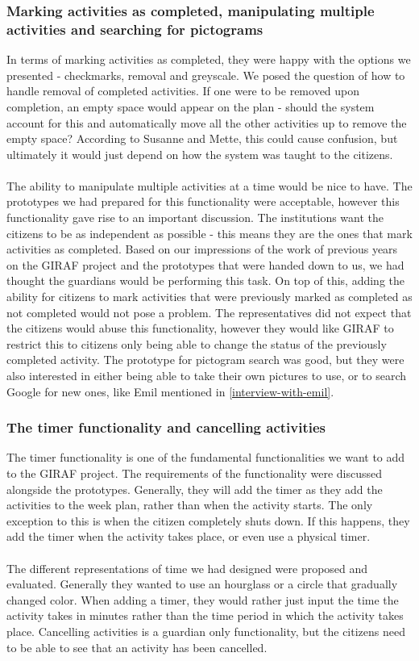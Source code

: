 \subsubsection{Marking activities as completed, manipulating multiple activities and searching for pictograms}
In terms of marking activities as completed, they were happy with the options we presented - checkmarks, removal and greyscale.
We posed the question of how to handle removal of completed activities.
If one were to be removed upon completion, an empty space would appear on the plan - should the system account for this and automatically move all the other activities up to remove the empty space?
According to Susanne and Mette, this could cause confusion, but ultimately it would just depend on how the system was taught to the citizens.
\\\\
The ability to manipulate multiple activities at a time would be nice to have.
The prototypes we had prepared for this functionality were acceptable, however this functionality gave rise to an important discussion.
The institutions want the citizens to be as independent as possible - this means they are the ones that mark activities as completed.
Based on our impressions of the work of previous years on the GIRAF project and the prototypes that were handed down to us, we had thought the guardians would be performing this task.
On top of this, adding the ability for citizens to mark activities that were previously marked as completed as not completed would not pose a problem.
The representatives did not expect that the citizens would abuse this functionality, however they would like GIRAF to restrict this to citizens only being able to change the status of the previously completed activity.
The prototype for pictogram search was good, but they were also interested in either being able to take their own pictures to use, or to search Google for new ones, like Emil mentioned in \autoref{interview-with-emil}.

\subsubsection{The timer functionality and cancelling activities}
The timer functionality is one of the fundamental functionalities we want to add to the GIRAF project.
The requirements of the functionality were discussed alongside the prototypes.
Generally, they will add the timer as they add the activities to the week plan, rather than when the activity starts.
The only exception to this is when the citizen completely shuts down.
If this happens, they add the timer when the activity takes place, or even use a physical timer.
\\\\
The different representations of time we had designed were proposed and evaluated.
Generally they wanted to use an hourglass or a circle that gradually changed color.
When adding a timer, they would rather just input the time the activity takes in minutes rather than the time period in which the activity takes place.
Cancelling activities is a guardian only functionality, but the citizens need to be able to see that an activity has been cancelled.

